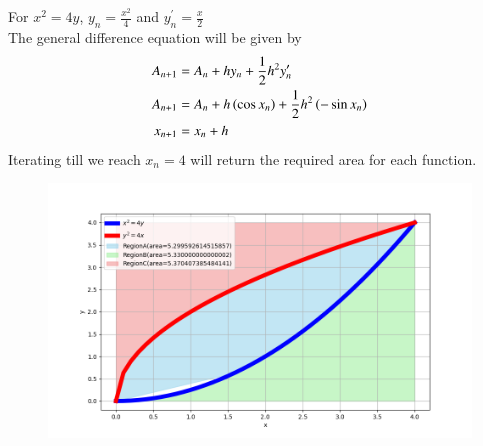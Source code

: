 \documentclass[journal,12pt,onecolumn]{IEEEtran}
\theoremstyle{remark}
\begin{document}
For $x^2=4y$, $y_n=\frac{x^2}{4}$ and $y^{\prime}_n= \frac{x}{2}$\\
The general difference equation will be given by
\begin{align}
  A_{n+1}&=A_n+hy_n+\frac{1}{2}h^2y^{\prime}_n\\
  A_{n+1}&=A_n+h\left(\cos{x_n}\right)+\frac{1}{2}h^2\left(-\sin{x_n}\right)\\
  x_{n+1}&=x_n+h
\end{align}
Iterating till we reach $x_n=4$ will return the required area for each function. \\
\begin{figure}[h!]
   \centering
   \includegraphics[width=1\columnwidth]{figs/Q3.png}
\end{figure}
\end{document}
